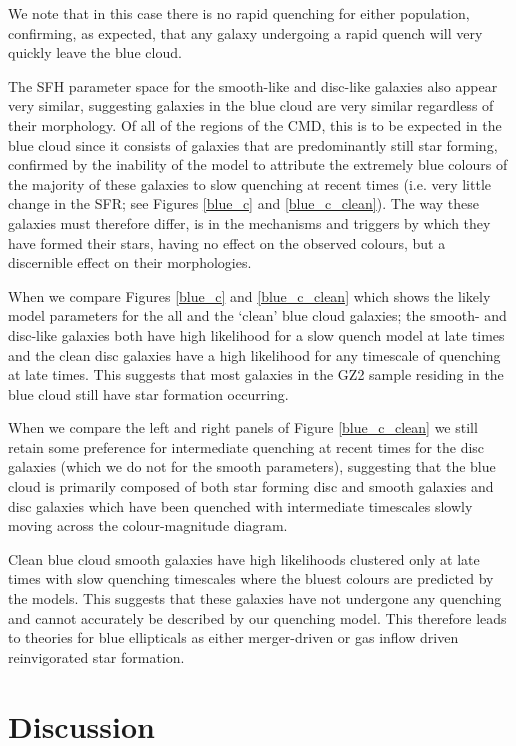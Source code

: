 \documentclass[useAMS,usenatbib]{mn2e}
\begin{document}
We note that in this case there is no rapid quenching for either population, confirming, as expected, that any galaxy undergoing a rapid quench will very quickly leave the blue cloud. 

The SFH parameter space for the smooth-like and disc-like galaxies also appear very similar, suggesting galaxies in the blue cloud are very similar regardless of their morphology. Of all of the regions of the CMD, this is to be expected in the blue cloud since it consists of galaxies that are predominantly still star forming, confirmed by the inability of the model to attribute the extremely blue colours of the majority of these galaxies to slow quenching at recent times (i.e. very little change in the SFR; see Figures \ref{blue_c} and \ref{blue_c_clean}). The way these galaxies must therefore differ, is in the mechanisms and triggers by which they have formed their stars, having no effect on the observed colours, but a discernible effect on their morphologies.

When we compare Figures \ref{blue_c} and \ref{blue_c_clean} which shows the likely model parameters for the all and the `clean' blue cloud galaxies; the smooth- and disc-like galaxies both have high likelihood for a slow quench model at late times and the clean disc galaxies have a high likelihood for any timescale of quenching at late times. This suggests that most galaxies in the GZ2 sample residing in the blue cloud still have star formation occurring. 

When we compare the left and right panels of Figure \ref{blue_c_clean} we still retain some preference for intermediate quenching at recent times for the disc galaxies (which we do not for the smooth parameters), suggesting that the blue cloud is primarily composed of both star forming disc and smooth galaxies and disc galaxies which have been quenched with intermediate timescales slowly moving across the colour-magnitude diagram.

Clean blue cloud smooth galaxies have high likelihoods clustered only at late times with slow quenching timescales where the bluest colours are predicted by the models. This suggests that these galaxies have not undergone any quenching and cannot accurately be described by our quenching model. This therefore leads to theories for blue ellipticals as either merger-driven or gas inflow driven reinvigorated star formation.


\section{Discussion}\label{diss}
\end{document}
